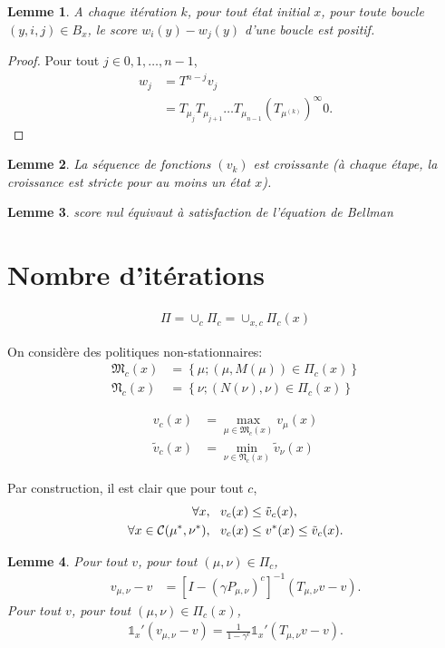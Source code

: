 \documentclass{article}
\newtheorem{lemma}{Lemme}
\def\1{{\mathds 1}}
\def\C{{\cal C}}
\def\N{\mathfrak N}
\def\M{\mathfrak M}
\begin{document}
\begin{lemma}
  A chaque itération $k$, pour tout état initial $x$, pour toute boucle $(y,i,j) \in B_x$, le score $w_i(y)-w_j(y)$ d'une boucle est positif.
\end{lemma}
\begin{proof}
  Pour tout $j \in {0,1,\dots,n-1}$,
  \begin{align}
    w_j & = T^{n-j}v_j  \\
    & = T_{\mu_{j}} T_{\mu_{j+1}} \dots T_{\mu_{n-1}} (T_{\mu^{(k)}})^\infty 0.
  \end{align}
\end{proof}

\begin{lemma}
La séquence de fonctions $(v_k)$ est croissante (à chaque étape, la croissance est stricte pour au moins un état $x$).
\end{lemma}

\begin{lemma}
  score nul équivaut à satisfaction de l'équation de Bellman
\end{lemma}


\section{Nombre d'itérations}

\begin{align}
  \Pi = \cup_c \Pi_c = \cup_{x,c} \Pi_c(x)
\end{align}

On considère des politiques non-stationnaires:
\begin{align}
  \M_c(x) & = \left\{ \mu ; (\mu,M(\mu)) \in \Pi_c(x)\right\} \\
  \N_c(x) & = \left\{ \nu ; (N(\nu),\nu) \in \Pi_c(x)\right\} 
\end{align}

\begin{align}
v_c(x) &= \max_{\mu \in \M_c(x)} v_{\mu}(x)\\
\tilde v_c(x) & = \min_{\nu \in \N_c(x)} \tilde v_{\nu}(x)
\end{align}

Par construction, il est clair que pour tout $c$, 
\begin{align}
\forall x,~~ v_c(x) &\le \tilde v_c(x), \\
\forall x \in \C(\mu^*,\nu^*),~~v_c(x) &\le v^*(x) \le \tilde v_c(x).
\end{align}

\begin{lemma}
  Pour tout $v$, pour tout $(\mu,\nu) \in \Pi_c$,
  \begin{align}
    v_{\mu,\nu} - v & = [I-(\gamma P_{\mu,\nu})^c]^{-1}(T_{\mu,\nu}v - v).
  \end{align}
  Pour tout $v$, pour tout $(\mu,\nu) \in \Pi_c(x)$,
  \begin{align}
  \1_x'(v_{\mu,\nu} - v) = \frac{1}{1-\gamma^c} \1_x'(T_{\mu,\nu}v - v).
  \end{align}
\end{lemma}
\end{document}
